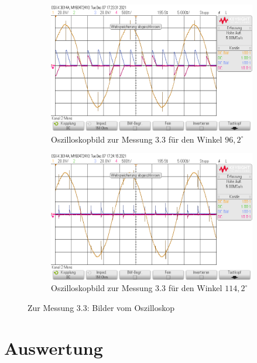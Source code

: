 \documentclass{article}
\begin{document}
\begin{figure}[h]
  \centering
  \begin{subfigure}{.45\textwidth}
    \centering
    \includegraphics[width=\linewidth]{../assets/images/GEP2/32_Winkel962.png}
    \caption{Oszilloskopbild zur Messung 3.3 für den Winkel $96,2^{\circ}$}
  \end{subfigure}
  \begin{subfigure}{.45\textwidth}
    \centering
    \includegraphics[width=\linewidth]{../assets/images/GEP2/32_Winkel1142.png}
    \caption{Oszilloskopbild zur Messung 3.3 für den Winkel $114,2^{\circ}$}
  \end{subfigure}
  \label{fig:31_242}
  \caption{Zur Messung 3.3: Bilder vom Oszilloskop}
\end{figure}

\newpage
\section{Auswertung}
\end{document}
